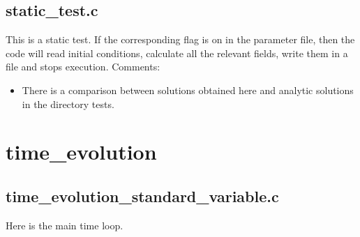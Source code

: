 \documentclass[letterpaper,10pt,english]{sphinxmanual}
\begin{document}
\subsection{static\_test.c}
\label{\detokenize{sphinx-c-apidoc/output/tests/static_test_c:static-test-c}}\label{\detokenize{sphinx-c-apidoc/output/tests/static_test_c::doc}}
This is a static test.  If the corresponding flag is on in the parameter file, then the code will read initial conditions, calculate all the relevant fields, write them in a file and stops execution.
Comments:
\begin{itemize}
\item {} 
There is a comparison between solutions obtained here and analytic solutions in the directory tests.

\end{itemize}

\begin{fulllineitems}
\label{\detokenize{sphinx-c-apidoc/output/tests/static_test_c:c.static_test}}%
\pysigstartmultiline
{}%
\pysigstopmultiline
\end{fulllineitems}



\section{time\_evolution}
\label{\detokenize{sphinx-c-apidoc/output/time_evolution/time_evolution:time-evolution}}\label{\detokenize{sphinx-c-apidoc/output/time_evolution/time_evolution::doc}}

\subsection{time\_evolution\_standard\_variable.c}
\label{\detokenize{sphinx-c-apidoc/output/time_evolution/time_evolution_standard_variable_c:time-evolution-standard-variable-c}}\label{\detokenize{sphinx-c-apidoc/output/time_evolution/time_evolution_standard_variable_c::doc}}
Here is the main time loop.
\end{document}
